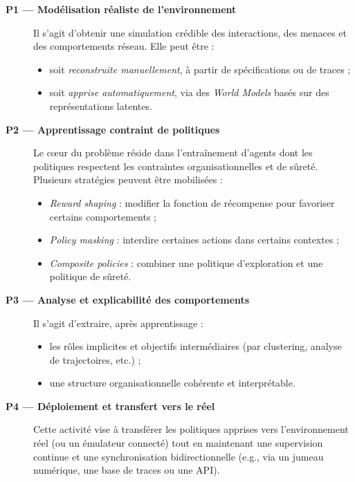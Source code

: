 \begin{description}
  \item[\textbf{P1 — Modélisation réaliste de l’environnement}]
        Il s’agit d’obtenir une simulation crédible des interactions, des menaces et des comportements réseau. Elle peut être :
        \begin{itemize}
          \item soit \emph{reconstruite manuellement}, à partir de spécifications ou de traces ;
          \item soit \emph{apprise automatiquement}, via des \textit{World Models} basés sur des représentations latentes.
        \end{itemize}

  \item[\textbf{P2 — Apprentissage contraint de politiques}]
        Le cœur du problème réside dans l’entraînement d’agents dont les politiques respectent les contraintes organisationnelles et de sûreté. Plusieurs stratégies peuvent être mobilisées :
        \begin{itemize}
          \item \emph{Reward shaping} : modifier la fonction de récompense pour favoriser certains comportements ;
          \item \emph{Policy masking} : interdire certaines actions dans certains contextes ;
          \item \emph{Composite policies} : combiner une politique d’exploration et une politique de sûreté.
        \end{itemize}

  \item[\textbf{P3 — Analyse et explicabilité des comportements}]
        Il s’agit d’extraire, après apprentissage :
        \begin{itemize}
          \item les rôles implicites et objectifs intermédiaires (par clustering, analyse de trajectoires, etc.) ;
          \item une structure organisationnelle cohérente et interprétable.
        \end{itemize}

  \item[\textbf{P4 — Déploiement et transfert vers le réel}]
        Cette activité vise à transférer les politiques apprises vers l’environnement réel (ou un émulateur connecté) tout en maintenant une supervision continue et une synchronisation bidirectionnelle (e.g., via un jumeau numérique, une base de traces ou une API).
\end{description}

